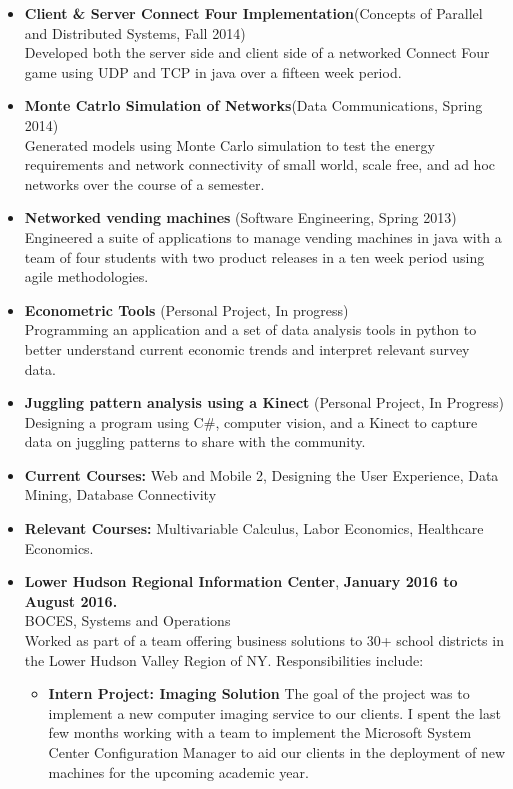 \documentclass[10pt]{article}
\begin{document}
\begin{itemize}[topsep=.5ex, itemsep=.25ex, partopsep=0ex, parsep=.5ex]
    	\item[] {\bf Client \& Server Connect Four Implementation}(Concepts of Parallel and Distributed Systems, Fall 2014)\\
    	Developed both the server side and client side of a networked Connect Four game using UDP and TCP in java over a fifteen week period.
	\item[] {\bf Monte Catrlo Simulation of Networks}(Data Communications, Spring 2014)\\
	Generated models using Monte Carlo simulation to test the energy requirements and network connectivity of small world, scale free, and ad hoc networks over the course of a semester.
	\item[] {\bf Networked vending machines} (Software Engineering, Spring 2013)\\
	Engineered a suite of applications to manage vending machines in java with a team of four students with two product releases in a ten week period using agile methodologies.
	\item[] {\bf Econometric Tools} (Personal Project, In progress)\\
	Programming  an application and a set of data analysis tools in python to better understand current economic trends and interpret relevant survey data.
	\item[] {\bf Juggling pattern analysis using a Kinect} (Personal Project, In Progress)\\
    	Designing a program using C\#, computer vision, and a Kinect to capture data on juggling patterns to share with the community.
	\item[] {\bf Current Courses:} Web and Mobile 2, Designing the User Experience, Data Mining, Database Connectivity
	\item[] {\bf Relevant Courses:} Multivariable Calculus, Labor Economics, Healthcare Economics.
\end{itemize}
\vspace{.5ex}
\begin{itemize} [topsep=.5ex, itemsep=.25ex, partopsep=0ex, parsep=.5ex]
	\item[] {{\bf Lower Hudson Regional Information Center}, \hfill {\bf January 2016 to August 2016.}}\\
	BOCES, Systems and Operations\\
	Worked as part of a team offering business solutions to 30+ school districts in the Lower Hudson Valley Region of NY. Responsibilities include:
	\begin{itemize} [topsep=.5ex, itemsep=.25ex, partopsep=0ex, parsep=.5ex]
		\item[] {\bf Intern Project: Imaging Solution}
		The goal of the project was to implement a new computer imaging service to our clients. I spent the last few months working with a team to implement the Microsoft System Center Configuration Manager to aid our clients in the deployment of new machines for the upcoming academic year. 
	\end{itemize}
\end{itemize}
\end{document}
